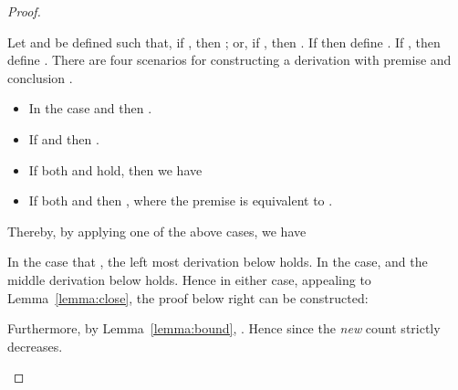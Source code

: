 \begin{proof}
\begin{enumerate}[label=\textbf{\Alph*},ref=\Alph*,leftmargin=*]
\begin{enumerate}[label*=\textbf{.\arabic*}]
Let  and  be defined such that, if , then ;
or, if , then .
If  then define .
If , then define .
There are four scenarios for constructing a derivation with premise  and conclusion .
\begin{itemize}
\item In the case  and  then .

\item If  and  then .

\item If both  and  hold, then 
we have 


\item If both  and  then 
,
where the premise is equivalent to 
.
\end{itemize}
Thereby, by applying one of the above cases,  we have 

In the case that ,  the left most derivation below holds. 
In the case,  and  the middle derivation below holds.  
Hence in either case, appealing to Lemma~\ref{lemma:close}, the proof below right can be constructed:


\noindent Furthermore, by Lemma~\ref{lemma:bound}, .
Hence  since the \textit{new} count strictly decreases.
\begin{comment}
Consider the fourth principal  case for \textit{new} where the bottommost rule of a proof is the \textit{new wen} rule of the form

where ,  and .

By induction, there exist  and  such that  and either  or , for ,
and -ary killing context  such that
.
Furthermore, the size of the proof of  is bounded above by the size of the proof of  enabling the induction hypothesis.
By induction again, there exist  and  such that  and either  or , for , and -ary killing context  such that 
.

Let  and  be defined such that, if , then ;
or, if , then .
If  for all , then define .
If for some  , then define .

In the following fix some  such that . There are four scenarios for .
In the case  for all , if  then  and if  then .


If, for some , , then , by Lemma~\ref{lemma:commute}, and one of the following hold.
\begin{itemize}
\item If, further to  for some ,  then 
.
\item
If, further to  for some ,   then 
.
\end{itemize}
Thereby, by applying one of the above cases for each , the following derivation can be constructed.
.


\end{comment}
\end{enumerate}
\end{enumerate}
\end{proof}
